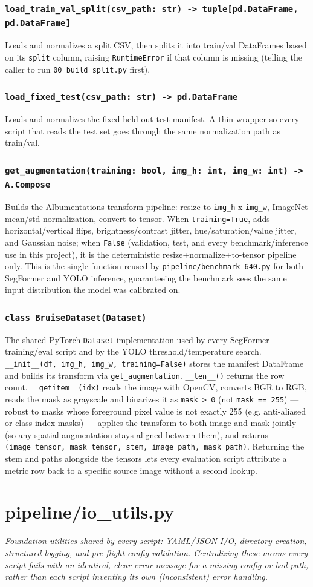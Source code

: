 \documentclass[11pt]{article}
\newcommand{\role}[1]{\par\noindent\textit{#1}\par\vspace{0.5em}}
\newcommand{\func}[1]{\subsubsection*{\texttt{#1}}}
\begin{document}
\func{load\_train\_val\_split(csv\_path: str) -> tuple[pd.DataFrame, pd.DataFrame]}
Loads and normalizes a split CSV, then splits it into train/val DataFrames based
on its \texttt{split} column, raising \texttt{RuntimeError} if that column is
missing (telling the caller to run \texttt{00\_build\_split.py} first).

\func{load\_fixed\_test(csv\_path: str) -> pd.DataFrame}
Loads and normalizes the fixed held-out test manifest. A thin wrapper so every
script that reads the test set goes through the same normalization path as
train/val.

\func{get\_augmentation(training: bool, img\_h: int, img\_w: int) -> A.Compose}
Builds the Albumentations transform pipeline: resize to \texttt{img\_h} x
\texttt{img\_w}, ImageNet mean/std normalization, convert to tensor. When
\texttt{training=True}, adds horizontal/vertical flips, brightness/contrast
jitter, hue/saturation/value jitter, and Gaussian noise; when \texttt{False}
(validation, test, and every benchmark/inference use in this project), it is the
deterministic resize+normalize+to-tensor pipeline only. This is the single
function reused by \texttt{pipeline/benchmark\_640.py} for both SegFormer and
YOLO inference, guaranteeing the benchmark sees the same input distribution the
model was calibrated on.

\func{class BruiseDataset(Dataset)}
The shared PyTorch \texttt{Dataset} implementation used by every SegFormer
training/eval script and by the YOLO threshold/temperature search.
\texttt{\_\_init\_\_(df, img\_h, img\_w, training=False)} stores the manifest
DataFrame and builds its transform via \texttt{get\_augmentation}.
\texttt{\_\_len\_\_()} returns the row count. \texttt{\_\_getitem\_\_(idx)} reads
the image with OpenCV, converts BGR to RGB, reads the mask as grayscale and
binarizes it as \texttt{mask > 0} (not \texttt{mask == 255}) --- robust to masks
whose foreground pixel value is not exactly 255 (e.g. anti-aliased or
class-index masks) --- applies the transform to both image and mask jointly (so
any spatial augmentation stays aligned between them), and returns
\texttt{(image\_tensor, mask\_tensor, stem, image\_path, mask\_path)}. Returning
the stem and paths alongside the tensors lets every evaluation script attribute
a metric row back to a specific source image without a second lookup.

\newpage
\section{pipeline/io\_utils.py}
\role{Foundation utilities shared by every script: YAML/JSON I/O, directory
creation, structured logging, and pre-flight config validation. Centralizing
these means every script fails with an identical, clear error message for a
missing config or bad path, rather than each script inventing its own
(inconsistent) error handling.}
\end{document}
